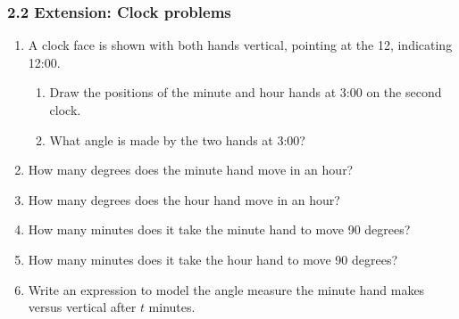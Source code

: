 

\fancyhead[LE]{\thepage}



\subsubsection*{2.2 Extension: Clock problems}
\begin{enumerate}[itemsep=0.5cm]
\item A clock face is shown with both hands vertical, pointing at the 12, indicating 12:00. 
\begin{enumerate}
  \item Draw the positions of the minute and hour hands at 3:00 on the second clock.
  \item What angle is made by the two hands at 3:00?
\end{enumerate}
   \hspace{2cm}

\item How many degrees does the minute hand move in an hour?
\item How many degrees does the hour hand move in an hour?
\item How many minutes does it take the minute hand to move 90 degrees?
\item How many minutes does it take the hour hand to move 90 degrees? 
\item Write an expression to model the angle measure the minute hand makes versus vertical after $t$ minutes. \vspace{0.5cm}


\end{enumerate}
